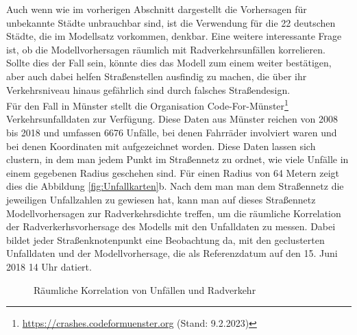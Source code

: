 \documentclass[a4paper,12pt]{thesis}
\begin{document}
Auch wenn wie im vorherigen Abschnitt dargestellt die Vorhersagen für unbekannte Städte unbrauchbar sind, ist die Verwendung für die 22 deutschen Städte, die im Modellsatz vorkommen, denkbar. Eine weitere interessante Frage ist, ob die Modellvorhersagen räumlich mit Radverkehrsunfällen korrelieren. Sollte dies der Fall sein, könnte dies das Modell zum einem weiter bestätigen, aber auch dabei helfen Straßenstellen ausfindig zu machen, die über ihr Verkehrsniveau hinaus gefährlich sind durch falsches Straßendesign.\\
Für den Fall in Münster stellt die Organisation Code-For-Münster\footnote{\url{https://crashes.codeformuenster.org} (Stand: 9.2.2023)} Verkehrsunfalldaten zur Verfügung. Diese Daten aus Münster reichen von 2008 bis 2018 und umfassen 6676 Unfälle, bei denen Fahrräder involviert waren und bei denen Koordinaten mit aufgezeichnet worden. Diese Daten lassen sich clustern, in dem man jedem Punkt im Straßennetz zu ordnet, wie viele Unfälle in einem gegebenen Radius geschehen sind. Für einen Radius von 64 Metern zeigt dies die Abbildung \ref{fig:Unfallkarten}b. Nach dem man man dem Straßennetz die jeweiligen Unfallzahlen zu gewiesen hat, kann man auf dieses Straßennetz Modellvorhersagen zur Radverkehrsdichte treffen, um die räumliche Korrelation der Radverkerhsvorhersage des Modells mit den Unfalldaten zu messen. Dabei bildet jeder Straßenknotenpunkt eine Beobachtung da, mit den geclusterten Unfalldaten und der Modellvorhersage, die als Referenzdatum auf den 15. Juni 2018 14 Uhr datiert.\\

\begin{figure}%
	\centering
	\qquad
	\caption{Räumliche Korrelation von Unfällen und Radverkehr}%
	\label{fig:UnfallKorrelatoon}%
\end{figure}
\end{document}
